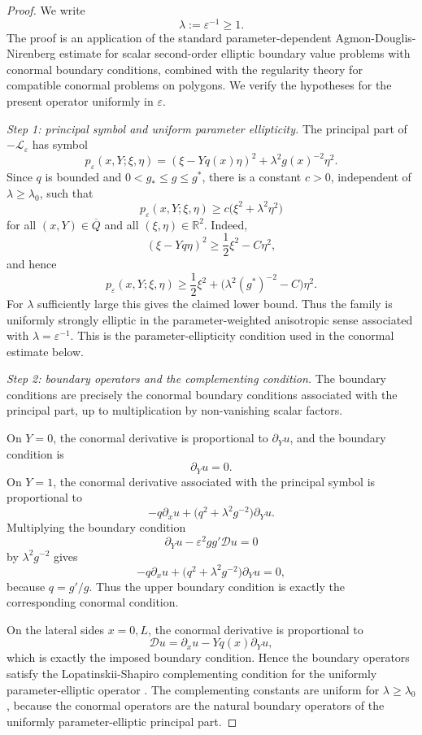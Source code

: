 \documentclass[11pt]{article}
\theoremstyle{definition}
\theoremstyle{remark}
\numberwithin{equation}{section}
\begin{document}
\begin{proof}
We write
\[
\lambda:=\varepsilon^{-1}\ge 1.
\]
The proof is an application of the standard parameter-dependent
Agmon-Douglis-Nirenberg estimate for scalar second-order elliptic boundary
value problems with conormal boundary conditions, combined with the regularity
theory for compatible conormal problems on polygons. We verify the hypotheses
for the present operator uniformly in \(\varepsilon\).

\emph{Step 1: principal symbol and uniform parameter ellipticity.}
The principal part of \(-\mathscr L_\varepsilon\) has symbol
\[
p_\varepsilon(x,Y;\xi,\eta)
=
(\xi-Yq(x)\eta)^2+\lambda^2g(x)^{-2}\eta^2 .
\]
Since \(q\) is bounded and \(0<g_*\le g\le g^*\), there is a constant
\(c>0\), independent of \(\lambda\ge\lambda_0\), such that
\[
p_\varepsilon(x,Y;\xi,\eta)
\ge
c\bigl(\xi^2+\lambda^2\eta^2\bigr)
\]
for all \((x,Y)\in\overline Q\) and all \((\xi,\eta)\in\mathbb R^2\).
Indeed,
\[
(\xi-Yq\eta)^2
\ge
\frac12\xi^2-C\eta^2,
\]
and hence
\[
p_\varepsilon(x,Y;\xi,\eta)
\ge
\frac12\xi^2+
\bigl(\lambda^2(g^*)^{-2}-C\bigr)\eta^2.
\]
For \(\lambda\) sufficiently large this gives the claimed lower bound. 
Thus the family is uniformly strongly elliptic in the parameter-weighted
anisotropic sense associated with \(\lambda=\varepsilon^{-1}\). This is the
parameter-ellipticity condition used in the conormal estimate below.

\emph{Step 2: boundary operators and the complementing condition.}
The boundary conditions are precisely the conormal boundary conditions
associated with the principal part, up to multiplication by non-vanishing
scalar factors.

On \(Y=0\), the conormal derivative is proportional to
\(\partial_Yu\), and the boundary condition is
\[
\partial_Yu=0.
\]
On \(Y=1\), the conormal derivative associated with the principal symbol is
proportional to
\[
-q\partial_xu+\bigl(q^2+\lambda^2g^{-2}\bigr)\partial_Yu.
\]
Multiplying the boundary condition
\[
\partial_Yu-\varepsilon^2gg'\mathcal D u=0
\]
by \(\lambda^2g^{-2}\) gives
\[
-q\partial_xu+\bigl(q^2+\lambda^2g^{-2}\bigr)\partial_Yu=0,
\]
because \(q=g'/g\). Thus the upper boundary condition is exactly the
corresponding conormal condition.

On the lateral sides \(x=0,L\), the conormal derivative is proportional to
\[
\mathcal D u=\partial_xu-Yq(x)\partial_Yu,
\]
which is exactly the imposed boundary condition. Hence the boundary operators
satisfy the Lopatinskii-Shapiro complementing condition for the uniformly
parameter-elliptic operator \cite{krupchyk2006sharpiro}. The complementing constants are uniform for
\(\lambda\ge\lambda_0\), because the conormal operators are the natural
boundary operators of the uniformly parameter-elliptic principal part.


\end{proof}
\end{document}
